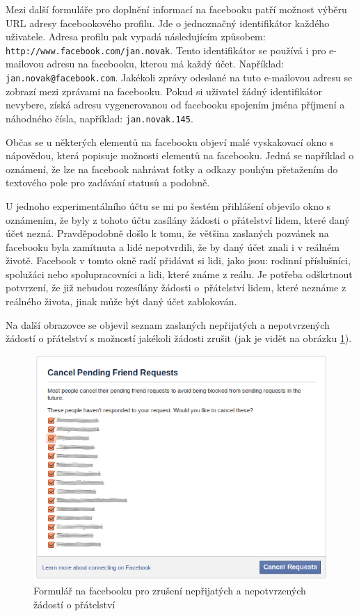 \documentclass[thesis=M,czech]{FITthesis}[2013/05/10]
\begin{document}
Mezi další formuláře pro doplnění informací na facebooku patří možnost výběru URL adresy facebookového profilu. Jde o jednoznačný identifikátor každého uživatele. Adresa profilu pak vypadá následujícím způsobem: \verb|http://www.facebook.com/jan.novak|. Tento identifikátor se používá i pro e-mailovou adresu na facebooku, kterou má každý účet. Například: \verb|jan.novak@facebook.com|. Jakékoli zprávy odeslané na tuto e-mailovou adresu se zobrazí mezi zprávami na facebooku. Pokud si uživatel žádný identifikátor nevybere, získá adresu vygenerovanou od facebooku spojením jména příjmení a náhodného čísla, například: \verb|jan.novak.145|.

Občas se u některých elementů na facebooku objeví malé vyskakovací okno s nápovědou, která popisuje možnosti elementů na facebooku. Jedná se například o oznámení, že lze na facebook nahrávat fotky a odkazy pouhým přetažením do textového pole pro zadávání statusů a podobně. 

U jednoho experimentálního účtu se mi po šestém přihlášení  objevilo okno s oznámením, že byly z tohoto účtu zasílány žádosti o přátelství lidem, které daný účet nezná. Pravděpodobně došlo k tomu, že většina zaslaných pozvánek na facebooku byla zamítnuta a lidé nepotvrdili, že by daný účet znali i v reálném životě. Facebook v tomto okně radí přidávat si lidi, jako jsou: rodinní příslušníci, spolužáci nebo spolupracovníci a lidi, které známe z reálu. Je potřeba odškrtnout potvrzení, že již nebudou rozesílány žádosti o~přátelství lidem, které neznáme z reálného života, jinak může být daný účet zablokován.

Na další obrazovce se objevil seznam zaslaných nepřijatých a nepotvrzených žádostí o přátelství s možností jakékoli žádosti zrušit (jak je vidět na obrázku \ref{fig:cancelPendingFrinedRequests}).

\begin{figure}[h]
\begin{center}
\includegraphics[width=5in]{figures/cancelPendingFriendRequests.png}
\caption{Formulář na facebooku pro zrušení nepřijatých  a nepotvrzených žádostí o přátelství}
\label{fig:cancelPendingFrinedRequests}
\end{center}
\end{figure}
\end{document}
